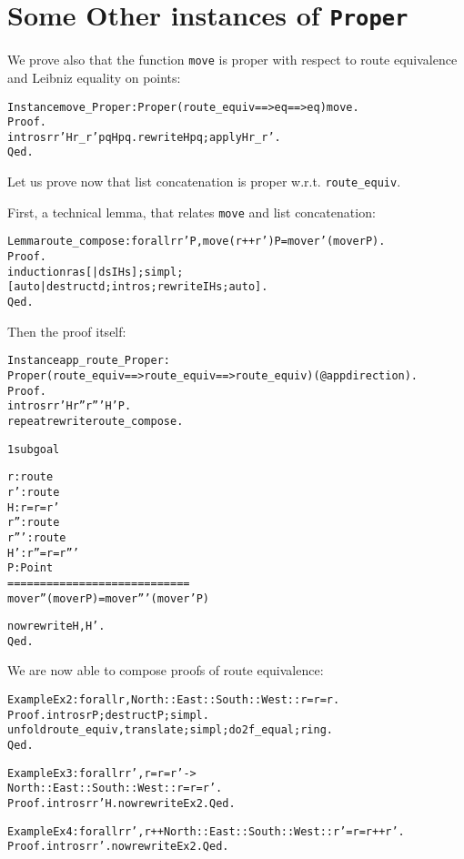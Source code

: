 \documentclass[a4]{report}
\begin{document}
\section{Some Other instances of \texttt{Proper}}


We prove also that the function \texttt{move} 
is proper with respect to route equivalence and Leibniz equality on points:


\begin{alltt}
Instance move_Proper : Proper (route_equiv ==> eq ==> eq) move. 
Proof.
  intros r r' Hr_r' p q Hpq. rewrite Hpq; apply Hr_r'.
Qed.
\end{alltt}


Let us prove now that list concatenation is proper w.r.t.
\texttt{route\_equiv}.

First, a technical lemma, that relates \texttt{move} and list concatenation:


\begin{alltt}
Lemma route_compose : forall r r' P, move (r++r') P = move r' (move r P).
Proof.
  induction r as [|d s IHs]; simpl;
    [auto | destruct d; intros;rewrite IHs;auto].
Qed.
\end{alltt}

Then the proof itself:
\begin{alltt}
Instance app_route_Proper : 
  Proper (route_equiv ==> route_equiv ==> route_equiv) (@app direction).
Proof.
  intros r r' H r'' r''' H' P.
  repeat rewrite route_compose.\it\color{red}

1 subgoal
  
  r : route
  r' : route
  H : r =r= r'
  r'' : route
  r''' : route
  H' : r'' =r= r'''
  P : Point
  ============================
    move r'' (move r P) = move r''' (move r' P)\tt\color{black}

  now rewrite H, H'.
Qed.
\end{alltt}

We are now able to compose proofs of route equivalence:

\begin{alltt}
Example Ex2 : forall r, North::East::South::West::r =r= r.
Proof. intros r P;destruct P;simpl. 
  unfold route_equiv, translate;simpl;do 2 f_equal;ring.
Qed.

Example Ex3 : forall r r', r =r= r' -> 
                North::East::South::West::r =r= r'.
Proof. intros r r' H. now rewrite Ex2. Qed.

Example Ex4 : forall r r',  r++ North::East::South::West::r' =r= r++r'.
Proof. intros r r'. now rewrite Ex2. Qed.
\end{alltt}
\end{document}
